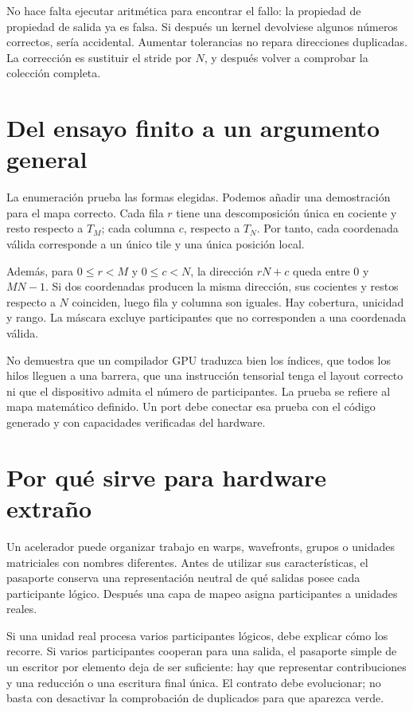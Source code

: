 \documentclass[12pt,a4paper,oneside]{report}
\begin{document}
No hace falta ejecutar aritmética para encontrar el fallo: la propiedad de propiedad de salida ya es falsa. Si después un kernel devolviese algunos números correctos, sería accidental. Aumentar tolerancias no repara direcciones duplicadas. La corrección es sustituir el stride por $N$, y después volver a comprobar la colección completa.

\section{Del ensayo finito a un argumento general}
La enumeración prueba las formas elegidas. Podemos añadir una demostración para el mapa correcto. Cada fila $r$ tiene una descomposición única en cociente y resto respecto a $T_M$; cada columna $c$, respecto a $T_N$. Por tanto, cada coordenada válida corresponde a un único tile y una única posición local.

Además, para $0\le r<M$ y $0\le c<N$, la dirección $rN+c$ queda entre 0 y $MN-1$. Si dos coordenadas producen la misma dirección, sus cocientes y restos respecto a $N$ coinciden, luego fila y columna son iguales. Hay cobertura, unicidad y rango. La máscara excluye participantes que no corresponden a una coordenada válida.

\begin{ejemplo}
No demuestra que un compilador GPU traduzca bien los índices, que todos los hilos lleguen a una barrera, que una instrucción tensorial tenga el layout correcto ni que el dispositivo admita el número de participantes. La prueba se refiere al mapa matemático definido. Un port debe conectar esa prueba con el código generado y con capacidades verificadas del hardware.

\end{ejemplo}
\section{Por qué sirve para hardware extraño}
Un acelerador puede organizar trabajo en warps, wavefronts, grupos o unidades matriciales con nombres diferentes. Antes de utilizar sus características, el pasaporte conserva una representación neutral de qué salidas posee cada participante lógico. Después una capa de mapeo asigna participantes a unidades reales.

Si una unidad real procesa varios participantes lógicos, debe explicar cómo los recorre. Si varios participantes cooperan para una salida, el pasaporte simple de un escritor por elemento deja de ser suficiente: hay que representar contribuciones y una reducción o una escritura final única. El contrato debe evolucionar; no basta con desactivar la comprobación de duplicados para que aparezca verde.
\end{document}
